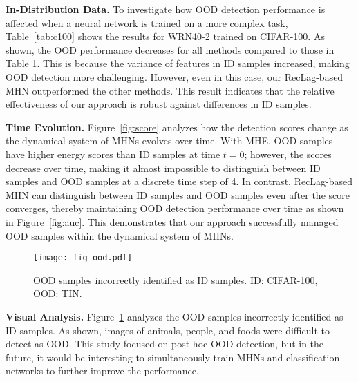 \noindent \textbf{In-Distribution Data.}
To investigate how OOD detection performance is affected when a neural network is trained on a more complex task, Table~\ref{tab:c100} shows the results for WRN40-2 trained on CIFAR-100.
As shown, the OOD performance decreases for all methods compared to those in Table 1. This is because the variance of features in ID samples increased, making OOD detection more challenging.
However, even in this case, our RecLag-based MHN outperformed the other methods. This result indicates that the relative effectiveness of our approach is robust against differences in ID samples.

\noindent \textbf{Time Evolution.}
Figure~\ref{fig:score} analyzes how the detection scores change as the dynamical system of MHNs evolves over time.
With MHE, OOD samples have higher energy scores than ID samples at time $t = 0$; however, the scores decrease over time, making it almost impossible to distinguish between ID samples and OOD samples at a discrete time step of 4.
In contrast, RecLag-based MHN can distinguish between ID samples and OOD samples even after the score converges, thereby maintaining OOD detection performance over time as shown in Figure~\ref{fig:auc}.
This demonstrates that our approach successfully managed OOD samples within the dynamical system of MHNs.

\begin{figure}
    \centering
\texttt{[image: fig\_ood.pdf]}
\caption{OOD samples incorrectly identified as ID samples. ID: CIFAR-100, OOD: TIN.}
\label{fig:analysis}
\end{figure}

\noindent \textbf{Visual Analysis.}
Figure~\ref{fig:analysis} analyzes the OOD samples incorrectly identified as ID samples.
As shown, images of animals, people, and foods were difficult to detect as OOD. This study focused on post-hoc OOD detection, but in the future, it would be interesting to simultaneously train MHNs and classification networks to further improve the performance.

